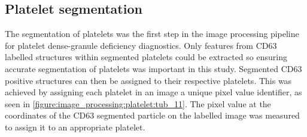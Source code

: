 \subsection{Platelet segmentation}
\label{platelets:image_processing:platelet}
The segmentation of platelets was the first step in the image processing pipeline for platelet dense-granule deficiency diagnostics. Only features from CD63 labelled structures within segmented platelets could be extracted so ensuring accurate segmentation of platelets was important in this study. Segmented CD63 positive structures can then be assigned to their respective platelets. This was achieved by assigning each platelet in an image a unique pixel value identifier, as seen in \autoref{figure:image_processing:platelet:tub_11}. The pixel value at the coordinates of the CD63 segmented particle on the labelled image was measured to assign it to an appropriate platelet.

